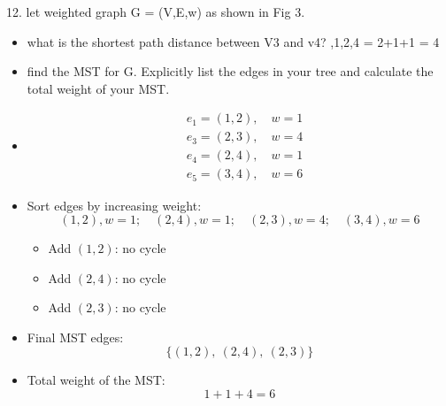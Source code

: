 \documentclass[12pt]{article}
\begin{document}
	12. let weighted graph G = (V,E,w) as shown in Fig 3.
	\begin{itemize}
	\item what is the shortest path distance between V3 and v4?
	,1,2,4 = 2+1+1 = 4
	\item find the MST for G. Explicitly list the edges in your tree and calculate the total weight of your MST.
	\item
	\[
	\begin{aligned}
		&e_1 = (1,2),\quad w = 1 \\
		&e_3 = (2,3),\quad w = 4 \\
		&e_4 = (2,4),\quad w = 1 \\
		&e_5 = (3,4),\quad w = 6
	\end{aligned}
	\]
	
	\item Sort edges by increasing weight:
	\[
	(1,2), w=1;\quad (2,4), w=1;\quad  (2,3), w=4;\quad (3,4), w=6
	\]
	
	\begin{itemize}
		\item Add $(1,2)$: no cycle
		\item Add $(2,4)$: no cycle
		\item Add $(2,3)$: no cycle
	\end{itemize}
	
	\item Final MST edges:
	\[
	\{(1,2),\ (2,4),\ (2,3)\}
	\]
	
	\item Total weight of the MST:
	\[
	1 + 1 + 4 = \boxed{6}
	\]
	\end{itemize}
	
\end{document}
